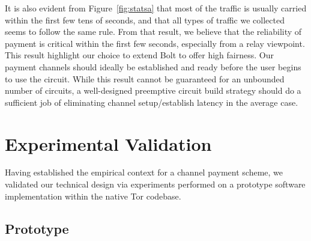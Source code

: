 It is also evident from Figure~\ref{fig:statsa} that most of the traffic is
usually carried within the first few tens of seconds, and that all types of
traffic we collected seems to follow the same rule. From that result, we believe
that the reliability of payment is critical within the first few seconds,
especially from a relay viewpoint. This result highlight our choice to extend
Bolt to offer high fairness. Our payment channels should ideally be established
and ready before the user begins to use the circuit. While this result cannot be
guaranteed for an unbounded number of circuits, a well-designed preemptive
circuit build strategy should do a sufficient job of eliminating channel
setup/establish latency in the average case.


\section{Experimental Validation}
\label{sec:experimentations}

Having established the empirical context for a channel payment scheme, we
validated our technical design via experiments performed on a prototype software
implementation within the native Tor codebase.

\subsection{Prototype}

